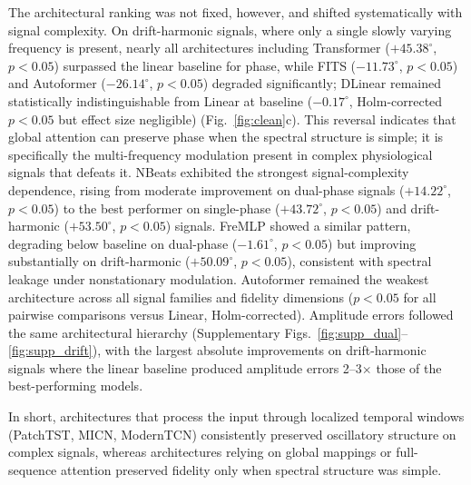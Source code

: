 The architectural ranking was not fixed, however, and shifted systematically with signal complexity. On drift-harmonic signals, where only a single slowly varying frequency is present, nearly all architectures including Transformer ($+45.38^{\circ}$, $p < 0.05$) surpassed the linear baseline for phase, while FITS ($-11.73^{\circ}$, $p < 0.05$) and Autoformer ($-26.14^{\circ}$, $p < 0.05$) degraded significantly; DLinear remained statistically indistinguishable from Linear at baseline ($-0.17^{\circ}$, Holm-corrected $p < 0.05$ but effect size negligible) (Fig.~\ref{fig:clean}c). This reversal indicates that global attention can preserve phase when the spectral structure is simple; it is specifically the multi-frequency modulation present in complex physiological signals that defeats it. NBeats exhibited the strongest signal-complexity dependence, rising from moderate improvement on dual-phase signals ($+14.22^{\circ}$, $p < 0.05$) to the best performer on single-phase ($+43.72^{\circ}$, $p < 0.05$) and drift-harmonic ($+53.50^{\circ}$, $p < 0.05$) signals. FreMLP showed a similar pattern, degrading below baseline on dual-phase ($-1.61^{\circ}$, $p < 0.05$) but improving substantially on drift-harmonic ($+50.09^{\circ}$, $p < 0.05$), consistent with spectral leakage under nonstationary modulation. Autoformer remained the weakest architecture across all signal families and fidelity dimensions ($p < 0.05$ for all pairwise comparisons versus Linear, Holm-corrected). Amplitude errors followed the same architectural hierarchy (Supplementary Figs.~\ref{fig:supp_dual}--\ref{fig:supp_drift}), with the largest absolute improvements on drift-harmonic signals where the linear baseline produced amplitude errors 2--3$\times$ those of the best-performing models.

In short, architectures that process the input through localized temporal windows (PatchTST, MICN, ModernTCN) consistently preserved oscillatory structure on complex signals, whereas architectures relying on global mappings or full-sequence attention preserved fidelity only when spectral structure was simple.

